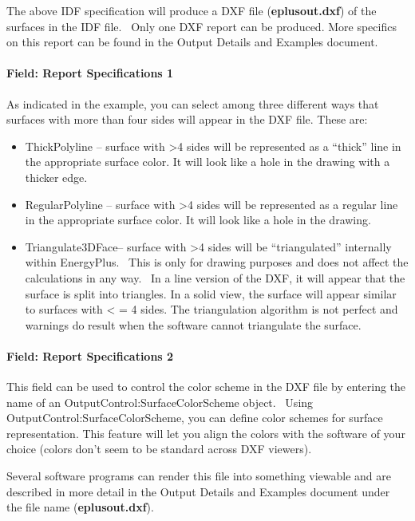 The above IDF specification will produce a DXF file (\textbf{eplusout.dxf}) of the surfaces in the IDF file.~ Only one DXF report can be produced. More specifics on this report can be found in the Output Details and Examples document.

\paragraph{Field: Report Specifications 1}\label{field-report-specifications-1}

As indicated in the example, you can select among three different ways that surfaces with more than four sides will appear in the DXF file. These are:

\begin{itemize}
\item
  ThickPolyline -- surface with \textgreater{}4 sides will be represented as a ``thick'' line in the appropriate surface color. It will look like a hole in the drawing with a thicker edge.
\item
  RegularPolyline -- surface with \textgreater{}4 sides will be represented as a regular line in the appropriate surface color. It will look like a hole in the drawing.
\item
  Triangulate3DFace-- surface with \textgreater{}4 sides will be ``triangulated'' internally within EnergyPlus.~ This is only for drawing purposes and does not affect the calculations in any way.~ In a line version of the DXF, it will appear that the surface is split into triangles. In a solid view, the surface will appear similar to surfaces with \textless{} = 4 sides. The triangulation algorithm is not perfect and warnings do result when the software cannot triangulate the surface.
\end{itemize}

\paragraph{Field: Report Specifications 2}\label{field-report-specifications-2}

This field can be used to control the color scheme in the DXF file by entering the name of an OutputControl:SurfaceColorScheme object.~ Using OutputControl:SurfaceColorScheme, you can define color schemes for surface representation. This feature will let you align the colors with the software of your choice (colors don't seem to be standard across DXF viewers).

Several software programs can render this file into something viewable and are described in more detail in the Output Details and Examples document under the file name (\textbf{eplusout.dxf}).

